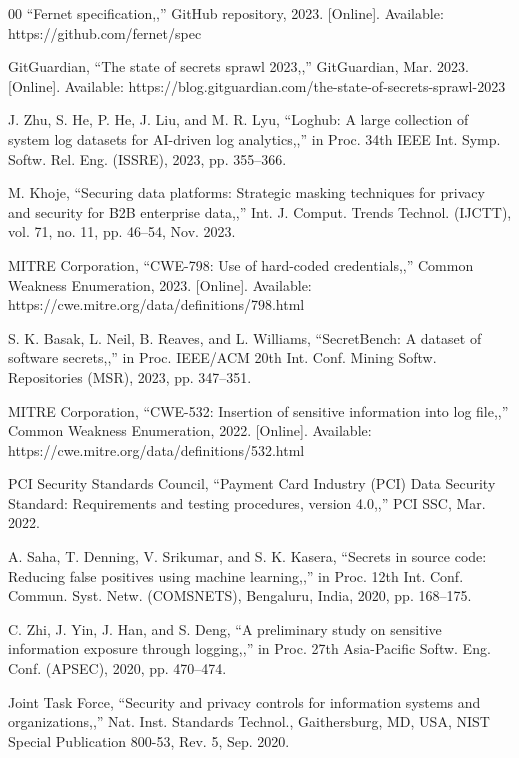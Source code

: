 \documentclass[conference]{IEEEtran}
\begin{document}
\begin{thebibliography}{00}
``Fernet specification,,'' GitHub repository, 2023. [Online]. Available: https://github.com/fernet/spec

GitGuardian, ``The state of secrets sprawl 2023,,'' GitGuardian, Mar. 2023. [Online]. Available: https://blog.gitguardian.com/the-state-of-secrets-sprawl-2023

J. Zhu, S. He, P. He, J. Liu, and M. R. Lyu, ``Loghub: A large collection of system log datasets for AI-driven log analytics,,'' in Proc. 34th IEEE Int. Symp. Softw. Rel. Eng. (ISSRE), 2023, pp. 355–366.

M. Khoje, ``Securing data platforms: Strategic masking techniques for privacy and security for B2B enterprise data,,'' Int. J. Comput. Trends Technol. (IJCTT), vol. 71, no. 11, pp. 46–54, Nov. 2023.

MITRE Corporation, ``CWE-798: Use of hard-coded credentials,,'' Common Weakness Enumeration, 2023. [Online]. Available: https://cwe.mitre.org/data/definitions/798.html

S. K. Basak, L. Neil, B. Reaves, and L. Williams, ``SecretBench: A dataset of software secrets,,'' in Proc. IEEE/ACM 20th Int. Conf. Mining Softw. Repositories (MSR), 2023, pp. 347–351.

MITRE Corporation, ``CWE-532: Insertion of sensitive information into log file,,'' Common Weakness Enumeration, 2022. [Online]. Available: https://cwe.mitre.org/data/definitions/532.html

PCI Security Standards Council, ``Payment Card Industry (PCI) Data Security Standard: Requirements and testing procedures, version 4.0,,'' PCI SSC, Mar. 2022.

A. Saha, T. Denning, V. Srikumar, and S. K. Kasera, ``Secrets in source code: Reducing false positives using machine learning,,'' in Proc. 12th Int. Conf. Commun. Syst. Netw. (COMSNETS), Bengaluru, India, 2020, pp. 168–175.

C. Zhi, J. Yin, J. Han, and S. Deng, ``A preliminary study on sensitive information exposure through logging,,'' in Proc. 27th Asia-Pacific Softw. Eng. Conf. (APSEC), 2020, pp. 470–474.

Joint Task Force, ``Security and privacy controls for information systems and organizations,,'' Nat. Inst. Standards Technol., Gaithersburg, MD, USA, NIST Special Publication 800-53, Rev. 5, Sep. 2020.


\end{thebibliography}
\end{document}
